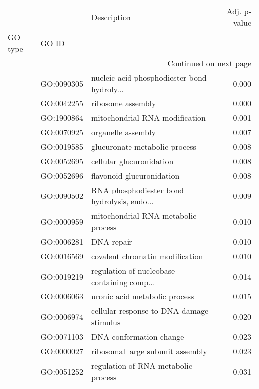 \begin{longtable}{lllr}
\toprule
   &            &                                  Description &  Adj. p-value \\
GO type & GO ID &                                              &               \\
\midrule
\endhead
\midrule
\multicolumn{4}{r}{{Continued on next page}} \\
\midrule
\endfoot

\bottomrule
\endlastfoot
\multirow{45}{*}{BP} & GO:0090305 &  nucleic acid phosphodiester bond hydroly... &         0.000 \\
   & GO:0042255 &                            ribosome assembly &         0.000 \\
   & GO:1900864 &               mitochondrial RNA modification &         0.001 \\
   & GO:0070925 &                           organelle assembly &         0.007 \\
   & GO:0019585 &                glucuronate metabolic process &         0.008 \\
   & GO:0052695 &                     cellular glucuronidation &         0.008 \\
   & GO:0052696 &                    flavonoid glucuronidation &         0.008 \\
   & GO:0090502 &  RNA phosphodiester bond hydrolysis, endo... &         0.009 \\
   & GO:0000959 &          mitochondrial RNA metabolic process &         0.010 \\
   & GO:0006281 &                                   DNA repair &         0.010 \\
   & GO:0016569 &              covalent chromatin modification &         0.010 \\
   & GO:0019219 &  regulation of nucleobase-containing comp... &         0.014 \\
   & GO:0006063 &                uronic acid metabolic process &         0.015 \\
   & GO:0006974 &     cellular response to DNA damage stimulus &         0.020 \\
   & GO:0071103 &                      DNA conformation change &         0.023 \\
   & GO:0000027 &             ribosomal large subunit assembly &         0.023 \\
   & GO:0051252 &          regulation of RNA metabolic process &         0.031 \\

\end{longtable}
